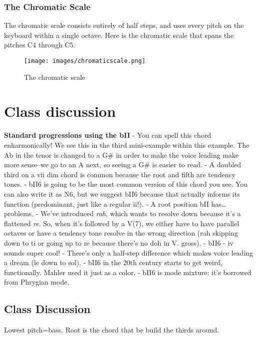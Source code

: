 \documentclass{book}
\begin{document}
\hypertarget{the-chromatic-scale}{%
\subsection{The Chromatic Scale}\label{the-chromatic-scale}}

The chromatic scale consists entirely of half steps, and uses every pitch on
the keyboard within a single octave. Here is the chromatic scale that spans
the pitches C4 through C5.

\begin{figure}
\centering
\texttt{[image: images/chromaticscale.png]}
\caption{The chromatic scale}
\end{figure}

\hypertarget{class-discussion-27}{%
\chapter{Class discussion}\label{class-discussion-27}}

\textbf{Standard progressions using the bII} - You can spell this chord
enharmonically! We see this in the third mini-example within this example. The
Ab in the tenor is changed to a G\# in order to make the voice leading make
more sense--we go to an A next, so seeing a G\# is easier to read. - A doubled
third on a vii dim chord is common because the root and fifth are tendency
tones. - bII6 is going to be the most common version of this chord you see.
You can also write it as N6, but we suggest bII6 because that actually informs
its function (predominant, just like a regular ii!). - A root position bII
has\ldots problems. - We've introduced \emph{rah}, which wants to resolve down
because it's a flattened \emph{re}. So, when it's followed by a V(7), we
either have to have parallel octaves or have a tendency tone resolve in the
wrong direction (rah skipping down to ti or going up to re because there's no
doh in V. gross). - bII6 - iv sounds super cool! - There's only a half-step
difference which makes voice leading a dream (le down to sol). - bII6 in the
20th century starts to get weird, functionally. Mahler used it just as a
color. - bII6 is mode mixture: it's borrowed from Phrygian mode.

\hypertarget{class-discussion-28}{%
\section{Class Discussion}\label{class-discussion-28}}

Lowest pitch=bass. Root is the chord that be build the thirds around.
\end{document}
